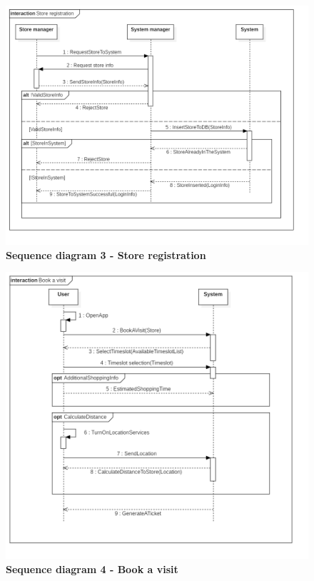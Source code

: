 \pagebreak

\begin{figure}[!htb]
\centering
\includegraphics[width=\textwidth]{Images/SequenceDiagram3_StoreRegistration}
\caption{\label{fig:sequence3}\textbf{Sequence diagram 3 - Store registration}}
\end{figure}

\begin{figure}[b]
\centering
\includegraphics[width=\textwidth]{Images/SequenceDiagram4_BookAVisit}
\caption{\label{fig:sequence4}\textbf{Sequence diagram 4 - Book a visit}}
\end{figure}

